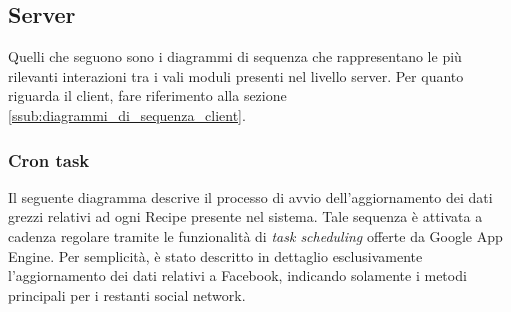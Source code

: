 %


\subsection{Server} %
\label{ssub:diagrammi_di_sequenza_server}
Quelli che seguono sono i diagrammi di sequenza che rappresentano le più rilevanti interazioni tra i vali moduli presenti nel livello server. Per quanto riguarda il client, fare riferimento alla sezione \ref{ssub:diagrammi_di_sequenza_client}.

    \subsubsection{Cron task} %
    \label{ssub:cron_task}
    Il seguente diagramma descrive il processo di avvio dell'aggiornamento dei dati grezzi relativi ad ogni Recipe presente nel sistema. Tale sequenza è attivata a cadenza regolare tramite le funzionalità di \textit{task scheduling} offerte da Google App Engine. Per semplicità, è stato descritto in dettaglio esclusivamente l'aggiornamento dei dati relativi a Facebook, indicando solamente i metodi principali per i restanti social network. \newline


